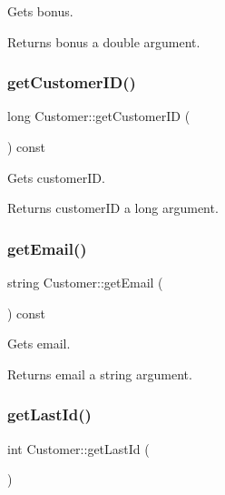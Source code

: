 Gets bonus. 

\begin{DoxyReturn}{Returns}
bonus a double argument. 
\end{DoxyReturn}
\mbox{\label{classCustomer_a5c5207f9678017b0fc42ed1f847d288f}} 
\subsubsection{\texorpdfstring{get\+Customer\+I\+D()}{getCustomerID()}}
{\footnotesize\ttfamily long Customer\+::get\+Customer\+ID (\begin{DoxyParamCaption}{ }\end{DoxyParamCaption}) const}



Gets customer\+ID. 

\begin{DoxyReturn}{Returns}
customer\+ID a long argument. 
\end{DoxyReturn}
\mbox{\label{classCustomer_a89fe5dc7065739347c436f673c68b249}} 
\subsubsection{\texorpdfstring{get\+Email()}{getEmail()}}
{\footnotesize\ttfamily string Customer\+::get\+Email (\begin{DoxyParamCaption}{ }\end{DoxyParamCaption}) const}



Gets email. 

\begin{DoxyReturn}{Returns}
email a string argument. 
\end{DoxyReturn}
\mbox{\label{classCustomer_a8bbc27f996653fc209aef876146a2667}} 
\subsubsection{\texorpdfstring{get\+Last\+Id()}{getLastId()}}
{\footnotesize\ttfamily int Customer\+::get\+Last\+Id (\begin{DoxyParamCaption}{ }\end{DoxyParamCaption})\hspace{0.3cm}{\ttfamily [static]}}



